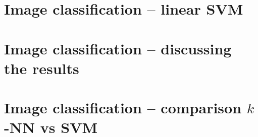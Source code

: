 \documentclass[a4paper,10pt]{article}
\begin{document}
\section{Image classification -- linear SVM}

\section{Image classification -- discussing the results}

\section{Image classification -- comparison $k$-NN vs SVM}


%
%
\end{document}

